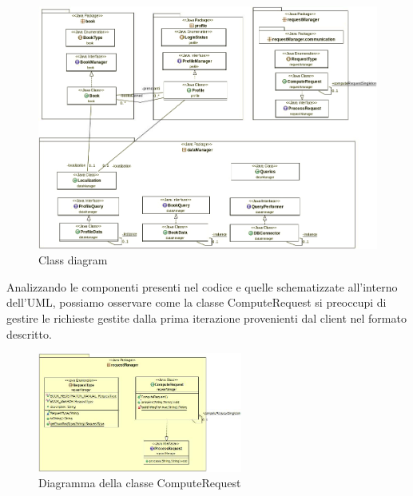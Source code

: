 \begin{figure}[h!]
	\includegraphics[width=\textwidth]{Immagini/iterazione_1_uml}
	\caption{Class diagram}
	\label{fig:ClassDiagramFirstIteration}
\end{figure}

Analizzando le componenti presenti nel codice e quelle schematizzate all'interno dell'UML, possiamo osservare come la classe ComputeRequest si preoccupi di gestire le richieste gestite dalla prima iterazione provenienti dal client nel formato descritto.

\begin{figure}[h!]
	\centering
	\includegraphics[width=0.6\textwidth]{Immagini/UML_ComputeRequestServer}
	\caption{Diagramma della classe ComputeRequest}
	\label{fig:Diagramma della class ComputeRequest}
\end{figure}

